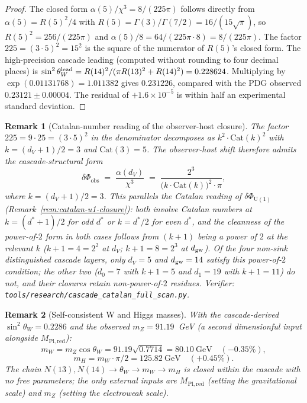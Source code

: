 \documentclass[12pt,a4paper]{article}
\newtheorem*{remark}{Remark}
\begin{document}
\begin{proof}
The closed form $\alpha(5)/\chi^3=8/(225\pi)$ follows directly from $\alpha(5)=R(5)^2/4$ with $R(5)=\Gamma(3)/\Gamma(7/2)=16/(15\sqrt{\pi})$, so $R(5)^2=256/(225\pi)$ and $\alpha(5)/8=64/(225\pi\cdot 8)=8/(225\pi)$. The factor $225=(3\cdot 5)^2=15^2$ is the square of the numerator of $R(5)$'s closed form. The high-precision cascade leading (computed without rounding to four decimal places) is $\sin^2\theta_W^{\rm lead}=R(14)^2/(\pi R(13)^2+R(14)^2)=0.228624$. Multiplying by $\exp(0.01131768)=1.011382$ gives $0.231226$, compared with the PDG observed $0.23121\pm 0.00004$. The residual of $+1.6\times 10^{-5}$ is within half an experimental standard deviation.
\end{proof}

\begin{remark}[Catalan-number reading of the observer-host closure]\label{rem:catalan-dV-closure}
The factor $225 = 9 \cdot 25 = (3 \cdot 5)^2$ in the denominator decomposes as $k^2 \cdot \mathrm{Cat}(k)^2$ with $k = (d_V+1)/2 = 3$ and $\mathrm{Cat}(3) = 5$. The observer-host shift therefore admits the cascade-structural form
\[
\delta\Phi_{\mathrm{obs}} \;=\; \frac{\alpha(d_V)}{\chi^3} \;=\; \frac{2^3}{\bigl(k \cdot \mathrm{Cat}(k)\bigr)^2 \cdot \pi},
\]
where $k = (d_V+1)/2 = 3$. This parallels the Catalan reading of $\delta\Phi_{\mathrm{U}(1)}$ (Remark~\ref{rem:catalan-u1-closure}): both involve Catalan numbers at $k = (d^*+1)/2$ for odd $d^*$ or $k = d^*/2$ for even $d^*$, and the cleanness of the power-of-$2$ form in both cases follows from $(k+1)$ being a power of $2$ at the relevant $k$ ($k+1 = 4 = 2^2$ at $d_V$; $k+1 = 8 = 2^3$ at $d_{\rm gw}$). Of the four non-sink distinguished cascade layers, only $d_V = 5$ and $d_{\rm gw} = 14$ satisfy this power-of-$2$ condition; the other two ($d_0 = 7$ with $k+1 = 5$ and $d_1 = 19$ with $k+1 = 11$) do not, and their closures retain non-power-of-$2$ residues. Verifier: \texttt{tools/research/cascade\_catalan\_full\_scan.py}.
\end{remark}

\begin{remark}[Self-consistent W and Higgs masses]
With the cascade-derived $\sin^2\theta_W = 0.2286$ and the observed
$m_Z = 91.19$~GeV (a second dimensionful input alongside $M_{\mathrm{Pl,red}}$):
\[
m_W = m_Z\cos\theta_W = 91.19\sqrt{0.7714} = 80.10~\text{GeV}\quad(-0.35\%),
\]
\[
m_H = m_W\cdot\pi/2 = 125.82~\text{GeV}\quad(+0.45\%).
\]
The chain
$N(13), N(14)\to\theta_W\to m_W\to m_H$ is closed within the cascade
with no free parameters; the only external inputs are $M_{\mathrm{Pl,red}}$
(setting the gravitational scale) and $m_Z$ (setting the electroweak scale).
\end{remark}
\end{document}
